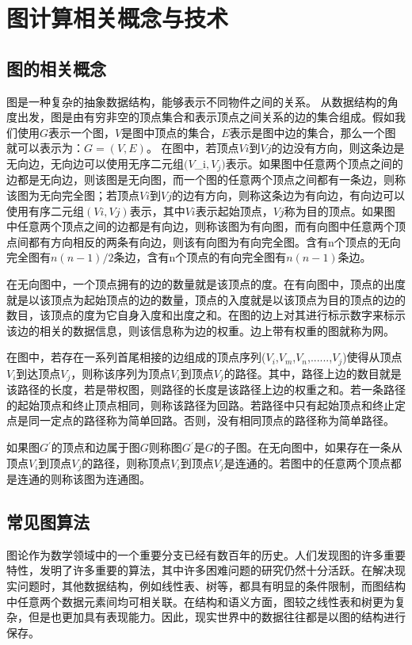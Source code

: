 
\chapter{图计算相关概念与技术}

\section{图的相关概念}
图是一种复杂的抽象数据结构，能够表示不同物件之间的关系。
从数据结构的角度出发，图是由有穷非空的顶点集合和表示顶点之间关系的边的集合组成。假如我们使用$G$表示一个图，$V$是图中顶点的集合，$E$表示是图中边的集合，那么一个图就可以表示为：$G=(V,E)$。
在图中，若顶点$Vi$到$Vj$的边没有方向，则这条边是无向边，无向边可以使用无序二元组$(V${_i}$,V_j)$表示。如果图中任意两个顶点之间的边都是无向边，则该图是无向图，而一个图的任意两个顶点之间都有一条边，则称该图为无向完全图；若顶点$Vi$到$Vj$的边有方向，则称这条边为有向边，有向边可以使用有序二元组$(Vi,Vj)$表示，其中$Vi$表示起始顶点，$Vj$称为目的顶点。如果图中任意两个顶点之间的边都是有向边，则称该图为有向图，而有向图中任意两个顶点间都有方向相反的两条有向边，则该有向图为有向完全图。含有n个顶点的无向完全图有$n(n-1)/2$条边，含有n个顶点的有向完全图有$n(n-1)$条边。

在无向图中，一个顶点拥有的边的数量就是该顶点的度。在有向图中，顶点的出度就是以该顶点为起始顶点的边的数量，顶点的入度就是以该顶点为目的顶点的边的数目，该顶点的度为它自身入度和出度之和。在图的边上对其进行标示数字来标示该边的相关的数据信息，则该信息称为边的权重。边上带有权重的图就称为网。

在图中，若存在一系列首尾相接的边组成的顶点序列($V$$_i$,$V$$_m$,$V$$_n$,......,$V$$_j$)使得从顶点$V$$_i$到达顶点$V$$_j$，则称该序列为顶点$V$$_i$到顶点$V$$_j$的路径。其中，路径上边的数目就是该路径的长度，若是带权图，则路径的长度是该路径上边的权重之和。若一条路径的起始顶点和终止顶点相同，则称该路径为回路。若路径中只有起始顶点和终止定点是同一定点的路径称为简单回路。否则，没有相同顶点的路径称为简单路径。

如果图$G$$^'$的顶点和边属于图$G$则称图$G$$^'$是$G$的子图。在无向图中，如果存在一条从顶点$V$$_i$到顶点$V$$_j$的路径，则称顶点$V$$_i$到顶点$V$$_j$是连通的。若图中的任意两个顶点都是连通的则称该图为连通图。


\section{常见图算法}
图论作为数学领域中的一个重要分支已经有数百年的历史。人们发现图的许多重要特性，发明了许多重要的算法，其中许多困难问题的研究仍然十分活跃。在解决现实问题时，其他数据结构，例如线性表、树等，都具有明显的条件限制，而图结构中任意两个数据元素间均可相关联。在结构和语义方面，图较之线性表和树更为复杂，但是也更加具有表现能力。因此，现实世界中的数据往往都是以图的结构进行保存。

